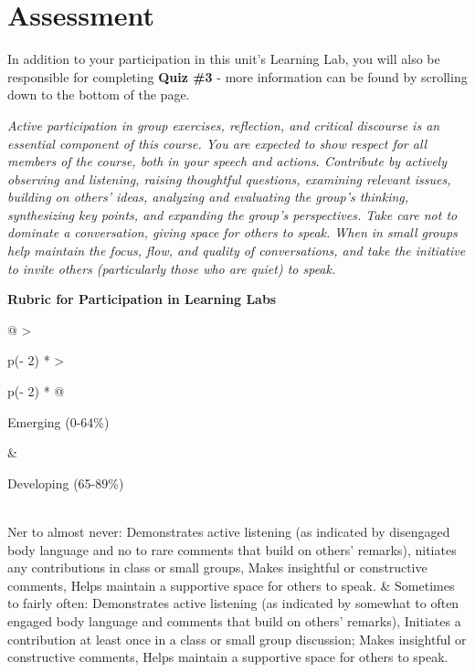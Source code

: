 \documentclass[
]{book}
\begin{document}
\hypertarget{assessment-11}{%
\section*{Assessment}\label{assessment-11}}

\begin{assessment}
In addition to your participation in this unit's Learning Lab, you will also be responsible for completing \textbf{Quiz \#3} - more information can be found by scrolling down to the bottom of the page.

\emph{Active participation in group exercises, reflection, and critical discourse is an essential component of this course. You are expected to show respect for all members of the course, both in your speech and actions. Contribute by actively observing and listening, raising thoughtful questions, examining relevant issues, building on others' ideas, analyzing and evaluating the group's thinking, synthesizing key points, and expanding the group's perspectives. Take care not to dominate a conversation, giving space for others to speak. When in small groups help maintain the focus, flow, and quality of conversations, and take the initiative to invite others (particularly those who are quiet) to speak.}

\textbf{Rubric for Participation in Learning Labs}

\begin{longtable}[]{@{}
  >{\raggedright\arraybackslash}p{(\columnwidth - 2\tabcolsep) * }
  >{\raggedright\arraybackslash}p{(\columnwidth - 2\tabcolsep) * }@{}}
\toprule\noalign{}
\begin{minipage}[b]{\linewidth}\raggedright
Emerging (0-64\%)
\end{minipage} & \begin{minipage}[b]{\linewidth}\raggedright
Developing (65-89\%)
\end{minipage} \\
\midrule\noalign{}
\endhead
\bottomrule\noalign{}
\endlastfoot
Ner to almost never: Demonstrates active listening (as indicated by disengaged body language and no to rare comments that build on others' remarks), nitiates any contributions in class or small groups, Makes insightful or constructive comments, Helps maintain a supportive space for others to speak. & Sometimes to fairly often: Demonstrates active listening (as indicated by somewhat to often engaged body language and comments that build on others' remarks), Initiates a contribution at least once in a class or small group discussion; Makes insightful or constructive comments, Helps maintain a supportive space for others to speak. \\
\end{longtable}


\end{assessment}
\end{document}
